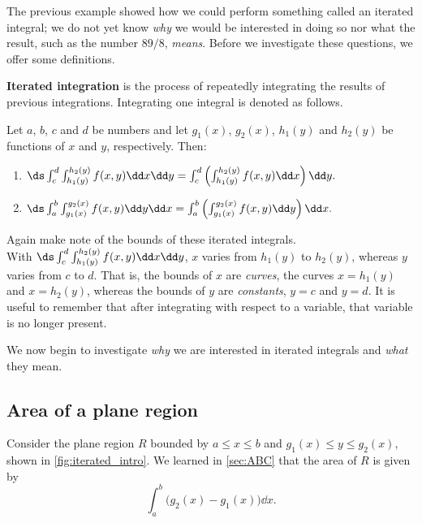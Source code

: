 The previous example showed how we could perform something called an iterated integral; we do not yet know \emph{why} we would be interested in doing so nor what the result, such as the number $89/8$, \emph{means}. Before we investigate these questions, we offer some definitions.

\begin{definition}\label{def:iterated_integral}%
\textbf{Iterated integration} is the process of repeatedly integrating the results of previous integrations. Integrating one integral is denoted as follows.\bigskip

Let $a$, $b$, $c$ and $d$ be numbers and let $g_1(x)$, $g_2(x)$, $h_1(y)$ and $h_2(y)$ be functions of $x$ and $y$, respectively. Then:
\begin{enumerate}
	\item $\ds \int_c^d\int_{h_1(y)}^{h_2(y)} f(x,y)\dd x\dd y = \int_c^d\left(\int_{h_1(y)}^{h_2(y)} f(x,y)\dd x\right)\dd y.$
	\item $\ds \int_a^b\int_{g_1(x)}^{g_2(x)} f(x,y)\dd y\dd x = \int_a^b\left(\int_{g_1(x)}^{g_2(x)} f(x,y)\dd y\right)\dd x.$
\end{enumerate}
\end{definition}

Again make note of the bounds of these iterated integrals.\\
With $\ds \int_c^d\int_{h_1(y)}^{h_2(y)} f(x,y)\dd x\dd y$, $x$ varies from $h_1(y)$ to $h_2(y)$, whereas $y$ varies from $c$ to $d$. That is, the bounds of $x$ are \emph{curves}, the curves $x=h_1(y)$ and $x=h_2(y)$, whereas the bounds of $y$ are \emph{constants}, $y=c$ and $y=d$. It is useful to remember that
after integrating with respect to a variable, that variable is no longer present.

We now begin to investigate \emph{why} we are interested in iterated integrals and \emph{what} they mean.

\subsection{Area of a plane region}

Consider the plane region $R$ bounded by $a\leq x\leq b$ and $g_1(x)\leq y\leq g_2(x)$, shown in \autoref{fig:iterated_intro}. We learned in \autoref{sec:ABC} that the area of $R$ is given by 
\[\int_a^b \bigl(g_2(x)-g_1(x)\bigr)\dd x.\]

